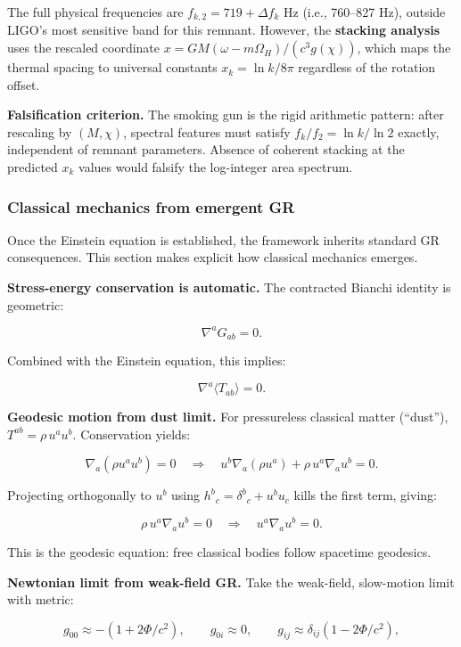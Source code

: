 \documentclass[11pt,a4paper]{article}
\theoremstyle{remark}
\begin{document}
The full physical frequencies are \(f_{k,2} = 719 + \Delta f_k\) Hz (i.e.,
760--827 Hz), outside LIGO's most sensitive band for this remnant. However,
the \textbf{stacking analysis} uses the rescaled coordinate \(x = GM(\omega -
m\Omega_H)/(c^3 g(\chi))\), which maps the thermal spacing to universal
constants \(x_k = \ln k / 8\pi\) regardless of the rotation offset.

\textbf{Falsification criterion.} The smoking gun is the rigid arithmetic pattern:
after rescaling by \((M, \chi)\), spectral features must satisfy \(f_k/f_2 =
\ln k / \ln 2\) exactly, independent of remnant parameters. Absence of
coherent stacking at the predicted \(x_k\) values would falsify the log-integer
area spectrum.

\subsubsection{Classical mechanics from emergent GR}\label{classical-mechanics-from-emergent-gr}

Once the Einstein equation is established, the framework inherits standard GR
consequences. This section makes explicit how classical mechanics emerges.

\textbf{Stress-energy conservation is automatic.} The contracted Bianchi identity
is geometric:

\[
\nabla^a G_{ab} = 0.
\]

Combined with the Einstein equation, this implies:

\[
\nabla^a \langle T_{ab} \rangle = 0.
\]

\textbf{Geodesic motion from dust limit.} For pressureless classical matter (``dust''),
\(T^{ab} = \rho \, u^a u^b\). Conservation yields:

\[
\nabla_a(\rho u^a u^b) = 0
\quad \Rightarrow \quad
u^b \nabla_a(\rho u^a) + \rho \, u^a \nabla_a u^b = 0.
\]

Projecting orthogonally to \(u^b\) using \(h^b{}_c = \delta^b{}_c + u^b u_c\) kills
the first term, giving:

\[
\rho \, u^a \nabla_a u^b = 0
\quad \Rightarrow \quad
u^a \nabla_a u^b = 0.
\]

This is the geodesic equation: free classical bodies follow spacetime geodesics.

\textbf{Newtonian limit from weak-field GR.} Take the weak-field, slow-motion limit
with metric:

\[
g_{00} \approx -(1 + 2\Phi/c^2), \qquad
g_{0i} \approx 0, \qquad
g_{ij} \approx \delta_{ij}(1 - 2\Phi/c^2),
\]
\end{document}
